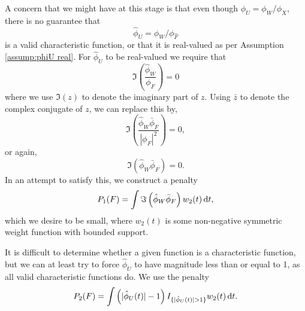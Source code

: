 	A concern that we might have at this stage is that even though $\phi_U = \phi_W / \phi_X$, there is no guarantee that 
	\begin{equation}
		\hat{\phi}_U = \hat{\phi}_W / \phi_{\hat{F}}
	\end{equation}
	is a valid characteristic function, or that it is real-valued as per Assumption \ref{assump:phiU real}.
	For $\hat{\phi}_U$ to be real-valued we require that
	\begin{equation}
		\Im \left( \frac{\hat{\phi}_W}{\phi_F} \right) = 0
	\end{equation}
	where we use $\Im(z)$ to denote the imaginary part of $z$. Using $\bar{z}$ to denote the complex conjugate of $z$, we can replace this by,
	\begin{equation}
		\Im \left(\frac{\hat{\phi}_W \bar{\phi}_F}{|\phi_F|^2} \right) = 0,
	\end{equation}
	or again,
	\begin{equation}
		\Im \left(\hat{\phi}_W \bar{\phi}_F\right) = 0.
	\end{equation}
	In an attempt to satisfy this, we construct a penalty
	\begin{align}
		P_1(F) = \int \Im \left(\hat{\phi}_W \bar{\phi}_F\right) w_2(t)\, \mathrm{d} t,
		\label{eq:penalty1}
	\end{align}
	which we desire to be small,
	where $w_2(t)$ is some non-negative symmetric weight function with bounded support.	

	It is difficult to determine whether a given function is a characteristic function, but we can at least try to force $\hat{\phi}_U$ to have magnitude less than or equal to 1, as all valid characteristic functions do. We use the penalty
	\begin{align}
		P_2(F) = \int \left(|\hat{\phi}_U(t)| - 1\right) I_{\{|\hat{\phi}_U(t)| > 1\}}  w_2(t) \, \mathrm{d} t.
		\label{eq:penalty2}
	\end{align} 

